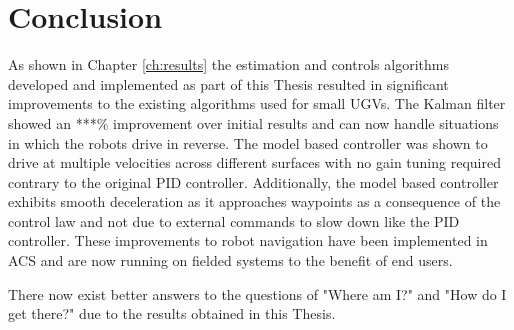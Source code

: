 \chapter{Conclusion}
\label{ch:conclusion}
As shown in Chapter \ref{ch:results} the estimation and controls algorithms developed and implemented as part of this Thesis resulted in significant improvements to the existing algorithms used for small UGVs. The Kalman filter showed an ***\% improvement over initial results and can now handle situations in which the robots drive in reverse. The model based controller was shown to drive at multiple velocities across different surfaces with no gain tuning required contrary to the original PID controller. Additionally, the model based controller exhibits smooth deceleration as it approaches waypoints as a consequence of the control law and not due to external commands to slow down like the PID controller. These improvements to robot navigation have been implemented in ACS and are now running on fielded systems to the benefit of end users.

There now exist better answers to the questions of "Where am I?" and "How do I get there?" due to the results obtained in this Thesis.
